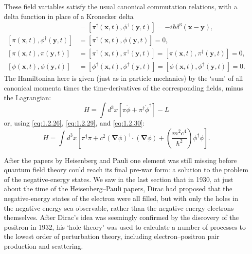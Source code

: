 These field variables satisfy the usual canonical commutation relations,
with a delta function in place of a Kronecker delta
\begin{align}
  [\pi(\mathbf x,t),\phi(\mathbf y,t)]
    &=[\pi^{\dagger}(\mathbf x,t),\phi^{\dagger}(\mathbf y,t)]
     =-i\hbar\delta^3(\mathbf x-\mathbf y),
  \tag{1.2.31}\label{eq:1.2.31}\\
  [\pi(\mathbf x,t),\phi^{\dagger}(\mathbf y,t)]
    &=[\pi^{\dagger}(\mathbf x,t),\phi(\mathbf y,t)]=0,
  \tag{1.2.32}\label{eq:1.2.32}\\
  [\pi(\mathbf x,t),\pi(\mathbf y,t)]
    &=[\pi^{\dagger}(\mathbf x,t),\pi^{\dagger}(\mathbf y,t)]
     =[\pi(\mathbf x,t),\pi^{\dagger}(\mathbf y,t)]=0,
  \tag{1.2.33}\label{eq:1.2.33}\\
  [\phi(\mathbf x,t),\phi(\mathbf y,t)]
    &=[\phi^{\dagger}(\mathbf x,t),\phi^{\dagger}(\mathbf y,t)]
     =[\phi(\mathbf x,t),\phi^{\dagger}(\mathbf y,t)]=0.
  \tag{1.2.34}\label{eq:1.2.34}
\end{align}
The Hamiltonian here is given (just as in particle mechanics) by the `sum' of
all canonical momenta times the time-derivatives of the corresponding fields,
minus the Lagrangian:
\begin{equation}
  H=\int d^3x\left[\pi\dot\phi+\pi^{\dagger}\dot\phi^{\dagger}\right]-L
  \tag{1.2.35}\label{eq:1.2.35}
\end{equation}
or, using \eqref{eq:1.2.26}, \eqref{eq:1.2.29}, and \eqref{eq:1.2.30}:
\begin{equation}
  H=\int d^3x\left[
    \pi^{\dagger}\pi
    +c^2(\boldsymbol\nabla\phi)^{\dagger}\cdot(\boldsymbol\nabla\phi)
    +\left(\frac{m^2c^4}{\hbar^2}\right)\phi^{\dagger}\phi
  \right].
  \tag{1.2.36}\label{eq:1.2.36}
\end{equation}

After the papers by Heisenberg and Pauli one element was still missing before
quantum field theory could reach its final pre-war form: a solution to the
problem of the negative-energy states. We saw in the last section that in
1930, at just about the time of the Heisenberg--Pauli papers, Dirac had
proposed that the negative-energy states of the electron were all filled, but
with only the holes in the negative-energy sea observable, rather than the
negative-energy electrons themselves. After Dirac's idea was seemingly
confirmed by the discovery of the positron in 1932, his `hole theory' was
used to calculate a number of processes to the lowest order of perturbation
theory, including electron--positron pair production and scattering.

